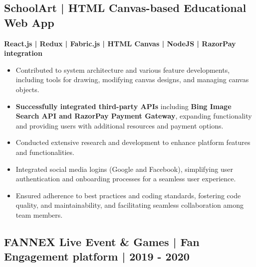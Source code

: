 \documentclass[letterpaper]{deedy-resume} %
\begin{document}
\begin{minipage}[t]{0.66\textwidth}
\subsection{SchoolArt | HTML Canvas-based Educational Web App}
\textbf{React.js | Redux | Fabric.js | HTML Canvas | NodeJS | RazorPay integration} \\
\vspace{-\topsep}
\vspace{-\topsep}
\begin{itemize}
    \setlength\itemsep{-0.5em} %
    \item Contributed to system architecture and various feature developments, including tools for drawing, modifying canvas designs, and managing canvas objects.
    \item \textbf{Successfully integrated third-party APIs} including \textbf{Bing Image Search API and RazorPay Payment Gateway}, expanding functionality and providing users with additional resources and payment options.
    \item Conducted extensive research and development to enhance platform features and functionalities.
    \item Integrated social media logins (Google and Facebook), simplifying user authentication and onboarding processes for a seamless user experience.
    \item Ensured adherence to best practices and coding standards, fostering code quality, and maintainability, and facilitating seamless collaboration among team members.
\end{itemize}

\sectionspace %




\subsection{FANNEX Live Event \& Games\href{https://fannexlive.com/}{\texorpdfstring{\faExternalLink}{}} | Fan Engagement 
platform | 2019 - 2020}


\end{minipage}
\end{document}
